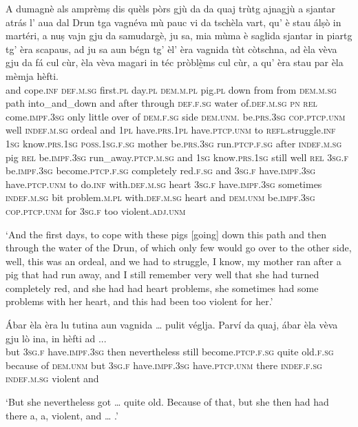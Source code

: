 \begin{linenumbers}
\gll    A dumagnè als amprèmṣ dis quèls pòrs gjù da da quaj trùtg ajnagjù a sjantar atrás l’ aua dal Drun tga vagnéva mù pauc vi da tschèla vart, qu’ è stau álṣò in martéri, a nuṣ vajn gju da samudargè, ju sa, mia mùma è saglida sjantar in piartg tg’ èra scapaus, ad ju sa aun bégn tg’ èl’ èra vagnida tùt còtschna, ad èla vèva gju da fá cul cùr, èla vèva magari in téc pròblè̱ms cul cùr, a qu’ èra stau par èla mèmja hèfti.\\
and cope.\textsc{inf} \textsc{def.m.sg} first.\textsc{pl}  day.\textsc{pl} \textsc{dem.m.pl}  pig.\textsc{pl} down from from \textsc{dem.m.sg} path into\_and\_down and after through  \textsc{def.f.sg} water of.\textsc{def.m.sg}  \textsc{pn} \textsc{rel} come.\textsc{impf.3sg} only little over of \textsc{dem.f.sg} side \textsc{dem.unm.} be.\textsc{prs.3sg} \textsc{cop.ptcp.unm} well \textsc{indef.m.sg} ordeal and \textsc{1pl} have.\textsc{prs.1pl} have.\textsc{ptcp.unm} to  \textsc{refl.}struggle.\textsc{inf} \textsc{1sg} know.\textsc{prs.1sg} \textsc{poss.1sg.f.sg} mother be.\textsc{prs.3sg} run.\textsc{ptcp.f.sg} after \textsc{indef.m.sg} pig \textsc{rel} be.\textsc{impf.3sg} run\_away.\textsc{ptcp.m.sg} and \textsc{1sg} know.\textsc{prs.1sg} still well \textsc{rel} \textsc{3sg.f} be.\textsc{impf.3sg} become.\textsc{ptcp.f.sg} completely red.\textsc{f.sg} and \textsc{3sg.f} have.\textsc{impf.3sg} have.\textsc{ptcp.unm} to do.\textsc{inf} with.\textsc{def.m.sg} heart \textsc{3sg.f} have.\textsc{impf.3sg} sometimes \textsc{indef.m.sg} bit problem.\textsc{m.pl} with.\textsc{def.m.sg} heart and \textsc{dem.unm}  be.\textsc{impf.3sg} \textsc{cop.ptcp.unm} for \textsc{3sg.f} too violent.\textsc{adj.unm} \\
\end{linenumbers}
\medskip
\glt `And the first days, to cope with these pigs [going] down this path and then through the water of the Drun, of which only few would go over to the other side, well, this was an ordeal, and we had to struggle, I know, my mother ran after a pig that had run away, and I still remember very well that she had turned completely red, and she had had heart problems, she sometimes had some problems with her heart, and this had been too violent for her.'
\medskip

\begin{linenumbers}
\gll    Ábar èla èra lu tutina aun vagnida … pulit véglja. Parví da quaj, ábar èla vèva gju lò ina, in hèfti ad ...\\
but \textsc{3sg.f} have.\textsc{impf.3sg} then nevertheless still become.\textsc{ptcp.f.sg} {} quite old.\textsc{f.sg} because of  \textsc{dem.unm} but \textsc{3sg.f}  have.\textsc{impf.3sg} have.\textsc{ptcp.unm} there \textsc{indef.f.sg} \textsc{indef.m.sg} violent and\\
\end{linenumbers}
\medskip
\glt `But she nevertheless got … quite old. Because of that, but she then had had there a, a, violent, and … .'
\medskip

